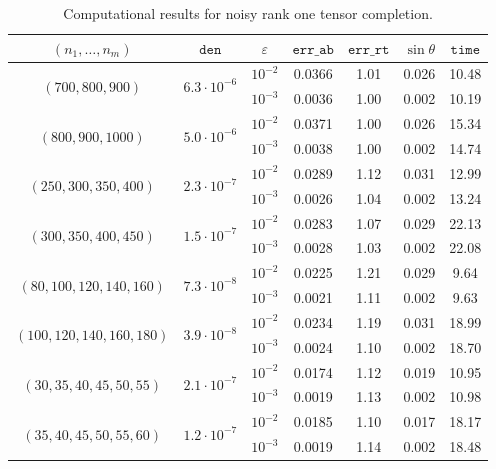 \documentclass{amsart}
\newcommand{\vareps}{\varepsilon}
\newcommand{\mt}[1]{\mathtt{#1}}
\newcommand{\ddd}{,\ldots,}
\theoremstyle{definition}
\numberwithin{equation}{section}
\begin{document}
\begin{table}[htb]
\caption{Computational results for noisy rank one tensor completion.}
\label{tab:m=3,4,5,6}
\centering
\begin{tabular}{ccccccc}
\toprule
$(n_1 \ddd n_m)$ & $\mt{den}$  & $\vareps$ & $\mt{err\_ab}$ & $\mt{err\_rt}$ & $\sin\theta$ & $\mt{time}$ \\
\midrule
\multirow{2}{*}{$(700,800,900)$} &
\multirow{2}{*}{$6.3 \cdot 10^{-6}$} &
$10^{-2}$ & 0.0366 & 1.01 & 0.026 & 10.48 \\
& & $10^{-3}$ & 0.0036 & 1.00 & 0.002 & 10.19 \\
\midrule
\multirow{2}{*}{$(800,900,1000)$} &
\multirow{2}{*}{$5.0 \cdot 10^{-6}$} &
$10^{-2}$ & 0.0371 & 1.00 & 0.026 & 15.34 \\
& & $10^{-3}$ & 0.0038 & 1.00 & 0.002 & 14.74 \\
\midrule
\multirow{2}{*}{$(250,300,350,400)$} &
\multirow{2}{*}{$ 2.3 \cdot 10^{-7}$} &
$10^{-2}$ & 0.0289 & 1.12 & 0.031 & 12.99 \\
& & $10^{-3}$ & 0.0026 & 1.04 & 0.002 & 13.24 \\
\midrule
\multirow{2}{*}{$(300,350,400,450)$} &
\multirow{2}{*}{$ 1.5 \cdot 10^{-7}$} &
$10^{-2}$ & 0.0283 & 1.07 & 0.029 & 22.13 \\
& & $10^{-3}$ & 0.0028 & 1.03 & 0.002 & 22.08 \\
\midrule
\multirow{2}{*}{$(80,100,120,140,160)$} &
\multirow{2}{*}{$ 7.3 \cdot 10^{-8}$} &
$10^{-2}$ & 0.0225 & 1.21 & 0.029 & 9.64 \\
& & $10^{-3}$ & 0.0021 & 1.11 & 0.002 & 9.63 \\
\midrule
\multirow{2}{*}{$(100,120,140,160,180)$} &
\multirow{2}{*}{$ 3.9 \cdot 10^{-8}$} &
$10^{-2}$ & 0.0234 & 1.19 & 0.031 & 18.99 \\
& & $10^{-3}$ & 0.0024 & 1.10 & 0.002 & 18.70 \\
\midrule
\multirow{2}{*}{$(30, 35, 40, 45, 50, 55)$} &
\multirow{2}{*}{$ 2.1 \cdot 10^{-7}$} &
$10^{-2}$ & 0.0174 & 1.12 & 0.019 & 10.95 \\
& & $10^{-3}$ & 0.0019 & 1.13 & 0.002 & 10.98 \\
\midrule
\multirow{2}{*}{$(35, 40, 45, 50, 55, 60)$} &
\multirow{2}{*}{$ 1.2 \cdot 10^{-7}$} &
$10^{-2}$ & 0.0185 & 1.10 & 0.017 & 18.17 \\
& & $10^{-3}$ & 0.0019 & 1.14 & 0.002 & 18.48 \\
\bottomrule
\end{tabular}
\end{table}
\end{document}
